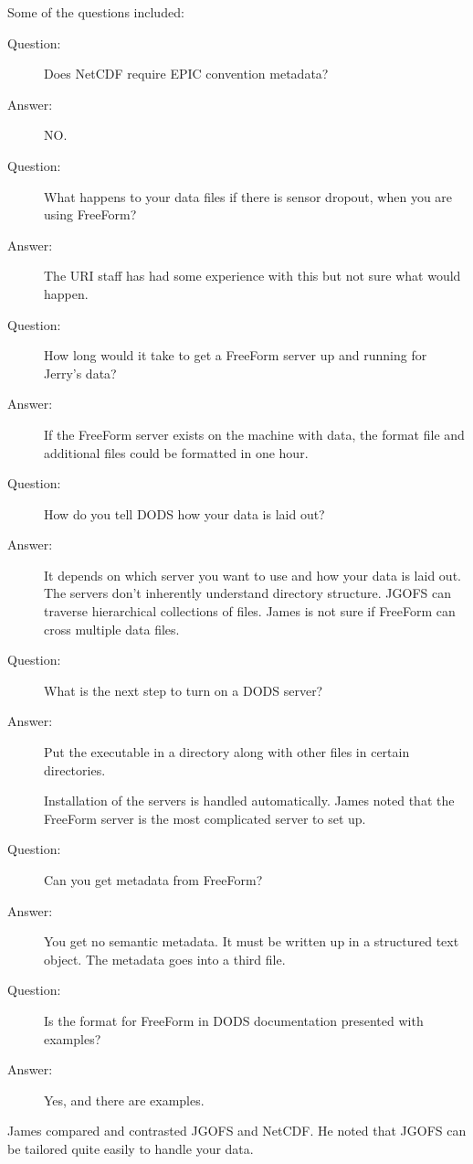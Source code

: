 Some of the questions included:
\begin{description}
\item[Question:]  Does NetCDF require EPIC convention metadata?
\item[Answer:]  NO.
  
\item[Question:] What happens to your data files if there is sensor
  dropout, when you are using FreeForm?
\item[Answer:] The URI staff has had some experience with this but not
  sure what would happen.
  
\item[Question:] How long would it take to get a FreeForm server up
  and running for Jerry's data?
\item[Answer:] If the FreeForm server exists on the machine with data,
  the format file and additional files could be formatted in one hour.
  
\item[Question:] How do you tell DODS how your data is laid out?
\item[Answer:] It depends on which server you want to use and how your
  data is laid out.  The servers don't inherently understand directory
  structure.  JGOFS can traverse hierarchical collections of files.
  James is not sure if FreeForm can cross multiple data files.
  
\item[Question:] What is the next step to turn on a DODS server?
\item[Answer:] Put the executable in a directory along with other
  files in certain directories.
  
  Installation of the servers is handled automatically.  James noted
  that the FreeForm server is the most complicated server to set up.
  
\item[Question:] Can you get metadata from FreeForm?
\item[Answer:] You get no semantic metadata.  It must be written up in
  a structured text object.  The metadata goes into a third file.
  
\item[Question:] Is the format for FreeForm in DODS documentation
  presented with examples?
\item[Answer:] Yes, and there are examples.
\end{description}

James compared and contrasted JGOFS and NetCDF.  He noted that JGOFS
can be tailored quite easily to handle your data.

